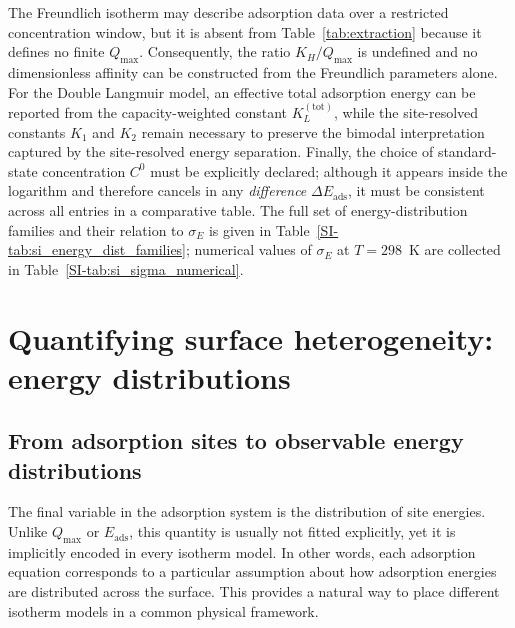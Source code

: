 \documentclass[journal=jacsat,manuscript=article]{achemso}
\begin{document}
	The Freundlich isotherm may describe adsorption data over a restricted concentration window, but it is absent from Table~\ref{tab:extraction} because it defines no finite $Q_{\max}$. Consequently, the ratio $K_H/Q_{\max}$ is undefined and no dimensionless affinity can be constructed from the Freundlich parameters alone. For the Double Langmuir model, an effective total adsorption energy can be reported from the capacity-weighted constant $K_L^{\mathrm{(tot)}}$, while the site-resolved constants $K_1$ and $K_2$ remain necessary to preserve the bimodal interpretation captured by the site-resolved energy separation. Finally, the choice of standard-state concentration $C^{0}$ must be explicitly declared; although it appears inside the logarithm and therefore cancels in any \emph{difference} $\Delta E_{\mathrm{ads}}$, it must be consistent across all entries in a comparative table. The full set of energy-distribution families and their relation to $\sigma_E$ is given in Table~\ref{SI-tab:si_energy_dist_families}; numerical values of $\sigma_E$ at $T = 298$~K are collected in Table~\ref{SI-tab:si_sigma_numerical}.
	\section{Quantifying surface heterogeneity: energy distributions}
	\label{sec:heterogeneity}
	
	\subsection{From adsorption sites to observable energy distributions}
	\label{sec:condensation}
	
	The final variable in the adsorption system is the distribution of site energies. Unlike $Q_{\max}$ or $E_{\mathrm{ads}}$, this quantity is usually not fitted explicitly, yet it is implicitly encoded in every isotherm model. In other words, each adsorption equation corresponds to a particular assumption about how adsorption energies are distributed across the surface. This provides a natural way to place different isotherm models in a common physical framework.
	
\end{document}
